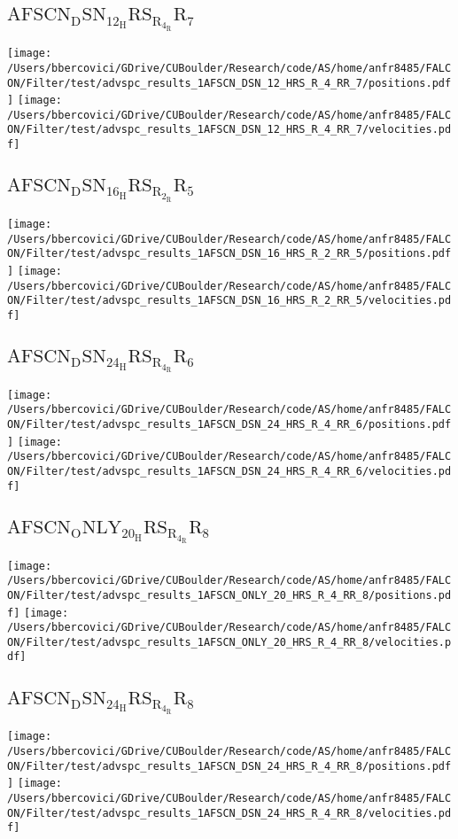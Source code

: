 \subsection{$\mathrm{AFSCN_DSN_12_HRS_R_4_RR_7}$}
\texttt{[image: /Users/bbercovici/GDrive/CUBoulder/Research/code/AS/home/anfr8485/FALCON/Filter/test/advspc\_results\_1AFSCN\_DSN\_12\_HRS\_R\_4\_RR\_7/positions.pdf]}
\texttt{[image: /Users/bbercovici/GDrive/CUBoulder/Research/code/AS/home/anfr8485/FALCON/Filter/test/advspc\_results\_1AFSCN\_DSN\_12\_HRS\_R\_4\_RR\_7/velocities.pdf]}
\subsection{$\mathrm{AFSCN_DSN_16_HRS_R_2_RR_5}$}
\texttt{[image: /Users/bbercovici/GDrive/CUBoulder/Research/code/AS/home/anfr8485/FALCON/Filter/test/advspc\_results\_1AFSCN\_DSN\_16\_HRS\_R\_2\_RR\_5/positions.pdf]}
\texttt{[image: /Users/bbercovici/GDrive/CUBoulder/Research/code/AS/home/anfr8485/FALCON/Filter/test/advspc\_results\_1AFSCN\_DSN\_16\_HRS\_R\_2\_RR\_5/velocities.pdf]}
\subsection{$\mathrm{AFSCN_DSN_24_HRS_R_4_RR_6}$}
\texttt{[image: /Users/bbercovici/GDrive/CUBoulder/Research/code/AS/home/anfr8485/FALCON/Filter/test/advspc\_results\_1AFSCN\_DSN\_24\_HRS\_R\_4\_RR\_6/positions.pdf]}
\texttt{[image: /Users/bbercovici/GDrive/CUBoulder/Research/code/AS/home/anfr8485/FALCON/Filter/test/advspc\_results\_1AFSCN\_DSN\_24\_HRS\_R\_4\_RR\_6/velocities.pdf]}
\subsection{$\mathrm{AFSCN_ONLY_20_HRS_R_4_RR_8}$}
\texttt{[image: /Users/bbercovici/GDrive/CUBoulder/Research/code/AS/home/anfr8485/FALCON/Filter/test/advspc\_results\_1AFSCN\_ONLY\_20\_HRS\_R\_4\_RR\_8/positions.pdf]}
\texttt{[image: /Users/bbercovici/GDrive/CUBoulder/Research/code/AS/home/anfr8485/FALCON/Filter/test/advspc\_results\_1AFSCN\_ONLY\_20\_HRS\_R\_4\_RR\_8/velocities.pdf]}
\subsection{$\mathrm{AFSCN_DSN_24_HRS_R_4_RR_8}$}
\texttt{[image: /Users/bbercovici/GDrive/CUBoulder/Research/code/AS/home/anfr8485/FALCON/Filter/test/advspc\_results\_1AFSCN\_DSN\_24\_HRS\_R\_4\_RR\_8/positions.pdf]}
\texttt{[image: /Users/bbercovici/GDrive/CUBoulder/Research/code/AS/home/anfr8485/FALCON/Filter/test/advspc\_results\_1AFSCN\_DSN\_24\_HRS\_R\_4\_RR\_8/velocities.pdf]}
